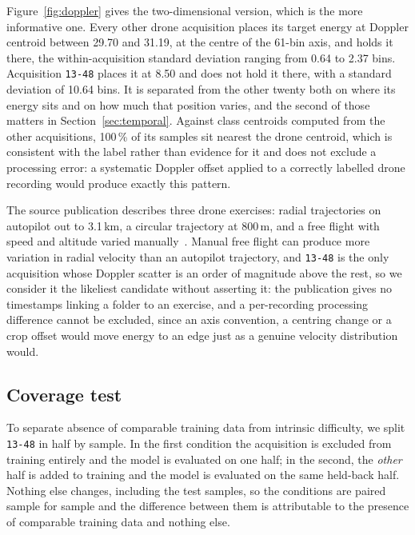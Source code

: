\documentclass[11pt,a4paper]{article}
\newcommand{\s}[1]{\texttt{#1}}            %
\newcommand{\tgt}{\s{13-48}}               %
\begin{document}
Figure~\ref{fig:doppler} gives the two-dimensional version, which is the more informative one. Every other drone acquisition places its target energy at Doppler centroid between 29.70 and 31.19, at the centre of the 61-bin axis, and holds it there, the within-acquisition standard deviation ranging from 0.64 to 2.37 bins. Acquisition \tgt{} places it at 8.50 and does not hold it there, with a standard deviation of 10.64 bins. It is separated from the other twenty both on where its energy sits and on how much that position varies, and the second of those matters in Section~\ref{sec:temporal}. Against class centroids computed from the other acquisitions, 100\,\% of its samples sit nearest the drone centroid, which is consistent with the label rather than evidence for it and does not exclude a processing error: a systematic Doppler offset applied to a correctly labelled drone recording would produce exactly this pattern.

The source publication describes three drone exercises: radial trajectories on autopilot out to 3.1\,km, a circular trajectory at 800\,m, and a free flight with speed and altitude varied manually~\cite{roldan2020,quevedo2019}. Manual free flight can produce more variation in radial velocity than an autopilot trajectory, and \tgt{} is the only acquisition whose Doppler scatter is an order of magnitude above the rest, so we consider it the likeliest candidate without asserting it: the publication gives no timestamps linking a folder to an exercise, and a per-recording processing difference cannot be excluded, since an axis convention, a centring change or a crop offset would move energy to an edge just as a genuine velocity distribution would.

\subsection{Coverage test}
\label{sec:coverage}

To separate absence of comparable training data from intrinsic difficulty, we split \tgt{} in half by sample. In the first condition the acquisition is excluded from training entirely and the model is evaluated on one half; in the second, the \emph{other} half is added to training and the model is evaluated on the same held-back half. Nothing else changes, including the test samples, so the conditions are paired sample for sample and the difference between them is attributable to the presence of comparable training data and nothing else.
\end{document}
